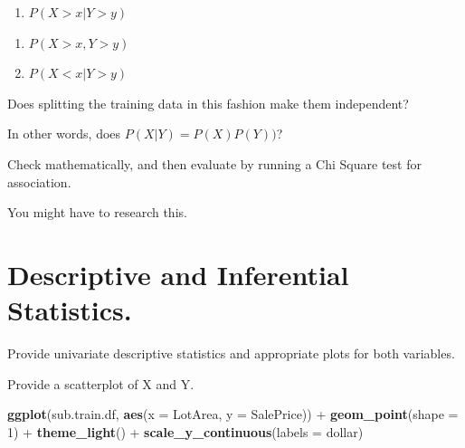 \documentclass[]{article}
\newenvironment{Shaded}{\begin{snugshade}}{\end{snugshade}}
\newcommand{\KeywordTok}[1]{\textcolor[rgb]{0.13,0.29,0.53}{\textbf{{#1}}}}
\newcommand{\DataTypeTok}[1]{\textcolor[rgb]{0.13,0.29,0.53}{{#1}}}
\newcommand{\DecValTok}[1]{\textcolor[rgb]{0.00,0.00,0.81}{{#1}}}
\newcommand{\StringTok}[1]{\textcolor[rgb]{0.31,0.60,0.02}{{#1}}}
\newcommand{\NormalTok}[1]{{#1}}
\providecommand{\tightlist}{%
  \setlength{\itemsep}{0pt}\setlength{\parskip}{0pt}}
\begin{document}
\begin{enumerate}
\def\labelenumi{\alph{enumi}.}
\tightlist
\item
  \(P(X>x | Y>y)\)
\end{enumerate}

\begin{Shaded}
\end{Shaded}

\begin{enumerate}
\def\labelenumi{\alph{enumi}.}
\setcounter{enumi}{1}
\item
  \(P(X>x, Y>y)\)
\item
  \(P(X<x | Y>y)\)
\end{enumerate}

Does splitting the training data in this fashion make them independent?

In other words, does \(P(X|Y)=P(X)P(Y))\)?

Check mathematically, and then evaluate by running a Chi Square test for
association.

You might have to research this.

\section{Descriptive and Inferential
Statistics.}\label{descriptive-and-inferential-statistics.}

Provide univariate descriptive statistics and appropriate plots for both
variables.

Provide a scatterplot of X and Y.

\begin{Shaded}
\begin{Highlighting}[]
\KeywordTok{ggplot}\NormalTok{(sub.train.df, }\KeywordTok{aes}\NormalTok{(}\DataTypeTok{x =} \NormalTok{LotArea, }\DataTypeTok{y =} \NormalTok{SalePrice)) +}\StringTok{ }\KeywordTok{geom_point}\NormalTok{(}\DataTypeTok{shape =} \DecValTok{1}\NormalTok{) +}\StringTok{ }
\StringTok{    }\KeywordTok{theme_light}\NormalTok{() +}\StringTok{ }\KeywordTok{scale_y_continuous}\NormalTok{(}\DataTypeTok{labels =} \NormalTok{dollar)}
\end{Highlighting}
\end{Shaded}
\end{document}
